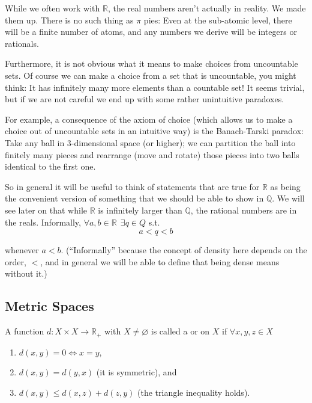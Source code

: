 \documentclass{article}
\begin{document}
\begin{tacomment}{1}
  While we often work with $\mathbb{R}$, the real numbers aren't actually in reality. We made them up. There is no such thing as $\pi$ pies: Even at the sub-atomic level, there will be a finite number of atoms, and any numbers we derive will be integers or rationals.

  Furthermore, it is not obvious what it means to make choices from uncountable sets.  Of course we can make a choice from a set that is uncountable, you might think: It has infinitely many more elements than a countable set! It seems trivial, but if we are not careful we end up with some rather unintuitive paradoxes.

  For example, a consequence of the axiom of choice (which allows us to make a choice out of uncountable sets in an intuitive way) is the Banach-Tarski paradox: Take any ball in 3-dimensional space (or higher); we can partition the ball into finitely many pieces and rearrange (move and rotate) those pieces into two balls identical to the first one.

  So in general it will be useful to think of statements that are true for $\mathbb{R}$ as being the convenient version of something that we should be able to show in $\mathbb{Q}$. We will see later on that while $\mathbb{R}$ is infinitely larger than $\mathbb{Q}$, the rational numbers are  in the reals. Informally, $\forall a, b \in \mathbb{R} ~~ \exists q \in Q$ s.t.
  \[
    a < q < b
  \]

  whenever $a < b$. (``Informally'' because the concept of density here depends on the order, $<$, and in general we will be able to define that being dense means without it.)
\end{tacomment}

\subsection{Metric Spaces}
\label{sub:metric_spaces}

\begin{definition}[distance]\label{def:lecture1_distance}
  A function $d: X \times X \to \mathbb{R}_+$ with $X \ne \varnothing$ is called a  or  on $X$ if $\forall x, y, z \in X$
  \begin{enumerate}
    \item $d(x, y) = 0 \iff x = y$,

    \item $d(x, y) = d(y, x)$ (it is symmetric), and

    \item $d(x, y) \le d(x, z) + d(z, y)$ (the triangle inequality holds).
  \end{enumerate}
\end{definition}
\end{document}

